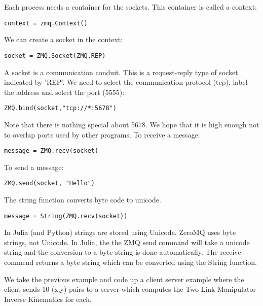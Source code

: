 Each process needs a container for the sockets. This container is called
a context:

\begin{verbatim}
context = zmq.Context()
\end{verbatim}

We can create a socket in the context:

\begin{verbatim}
socket = ZMQ.Socket(ZMQ.REP)
\end{verbatim}

A socket is a communication conduit. This is a request-reply type of
socket indicated by 'REP'. We need to select the communication protocol
(tcp), label the address and select the port (5555):

\begin{verbatim}
ZMQ.bind(socket,"tcp://*:5678")
\end{verbatim}

Note that there is nothing special about 5678. We hope that it is high
enough not to overlap ports used by other programs. To receive a
message:

\begin{verbatim}
message = ZMQ.recv(socket)
\end{verbatim}

To send a message:

\begin{verbatim}
ZMQ.send(socket, "Hello")
\end{verbatim}

The string function converts byte code to unicode.

\begin{verbatim}
message = String(ZMQ.recv(socket))
\end{verbatim}

In Julia (and Python) strings are stored using Unicode. ZeroMQ uses byte
strings, not Unicode. In Julia, the the ZMQ send command will take a
unicode string and the conversion to a byte string is done
automatically. The receive commend returns a byte string which can be
converted using the String function.

We take the previous example and code up a client server example where
the client sends 10 (x,y) pairs to a server which computes the Two Link
Manipulator Inverse Kinematics for each.


